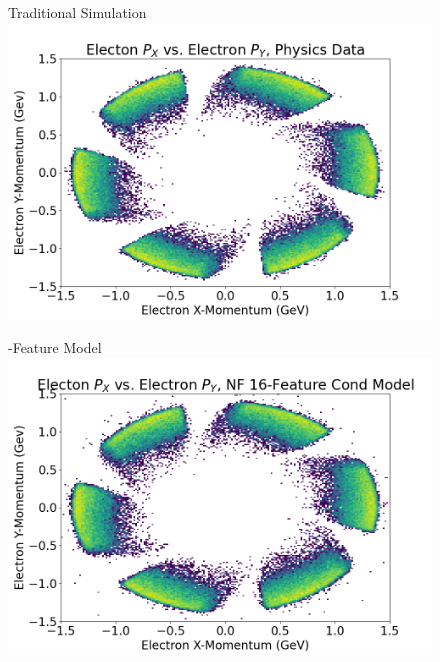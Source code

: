         \begin{figure}[H]
            \centering
             \begin{minipage}{0.31323\textwidth}
                \centering
                Traditional Simulation
                \includegraphics[width=.99\textwidth,trim={0 0 0 0},clip]{Chapters/Ch3-Simulations/normalizing_flows/pics/FinalPictures/Hists2D/Electon_P_X_vs_Electron_P_Y,_Physics_Data.png}
                
            \end{minipage}
                 \begin{minipage}{0.31323\textwidth}
                -Feature Model
                \includegraphics[width=.99\textwidth,trim={0 0 0 0},clip]{Chapters/Ch3-Simulations/normalizing_flows/pics/FinalPictures/Hists2D/Electon_P_X_vs_Electron_P_Y,_NF_16-Feature_Cond_Model.png}
        

\end{minipage}
\end{figure}
